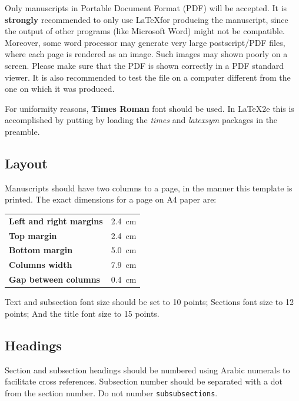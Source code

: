 \documentclass[10pt, a4paper]{article}
\begin{document}
Only manuscripts in Portable Document Format (PDF) will be accepted.
It is \textbf{strongly} recommended to only use \LaTeX for producing the manuscript, since the output of other programs (like Microsoft Word) might not be compatible.
Moreover, some word processor may generate very large postscript/PDF files, where each page is rendered as an image.
Such images may shown poorly on a screen.
Please make sure that the PDF is shown correctly in a PDF standard viewer.
It is also recommended to test the file on a computer different from the one on which it was produced.

For uniformity reasons, {\bf Times Roman} font should be used.
In \LaTeX2e this is accomplished by putting by loading the \textit{times} and \textit{latexsym} packages in the preamble.

\subsection{Layout}
\label{subsec:layout}

Manuscripts should have two columns to a page, in the manner this template is printed.
The exact dimensions for a page on A4 paper are:

\begin{table}[h!]
	\renewcommand{\arraystretch}{1.5}
	\begin{tabular}{>{\bfseries}lS}
		Left and right margins 	& \SI{2.4}{\centi\meter}\\
		Top margin				& \SI{2.4}{\centi\meter}\\
		Bottom margin			& \SI{5.0}{\centi\meter}\\
		Columns width			& \SI{7.9}{\centi\meter}\\
		Gap between columns		& \SI{0.4}{\centi\meter}\\
	\end{tabular}
\end{table}
%
Text and subsection font size should be set to 10 points;
Sections font size to 12 points;
And the title font size to 15 points.

\subsection{Headings}
\label{subsec:headings}

Section and subsection headings should be numbered  using Arabic numerals to facilitate cross references. Subsection number should be separated with a dot from the section number.
Do not number \texttt{subsubsections}.
\end{document}
